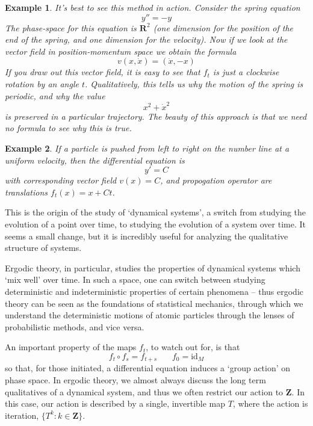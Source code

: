 \documentclass[12pt]{report}
\theoremstyle{plain}
\newtheorem*{example}{Example}
\theoremstyle{definition}
\begin{document}
\begin{example}
    It's best to see this method in action. Consider the spring equation
    \[ y'' = -y \]
    The phase-space for this equation is $\mathbf{R}^2$ (one dimension for the position of the end of the spring, and one dimension for the velocity). Now if we look at the vector field in position-momentum space we obtain the formula
    \[ v(x,\dot{x}) = (\dot{x}, -x) \]
    If you draw out this vector field, it is easy to see that $f_t$ is just a clockwise rotation by an angle $t$. Qualitatively, this tells us why the motion of the spring is periodic, and why the value
    \[ x^2 + \dot{x}^2 \]
    is preserved in a particular trajectory. The beauty of this approach is that we need no formula to see why this is true.
\end{example}

\begin{example}
    If a particle is pushed from left to right on the number line at a uniform velocity, then the differential equation is
    \[ y' = C \]
    with corresponding vector field $v(x) = C$, and propogation operator are translations $f_t(x) = x + Ct$.
\end{example}

This is the origin of the study of `dynamical systems', a switch from studying the evolution of a point over time, to studying the evolution of a system over time. It seems a small change, but it is incredibly useful for analyzing the qualitative structure of systems.

Ergodic theory, in particular, studies the properties of dynamical systems which `mix well' over time. In such a space, one can switch between studying deterministic and indeterministic properties of certain phenomena -- thus ergodic theory can be seen as the foundations of statistical mechanics, through which we understand the deterministic motions of atomic particles through the lenses of probabilistic methods, and vice versa.

An important property of the maps $f_t$, to watch out for, is that
%
\[ f_t \circ f_s = f_{t+s}\ \ \ \ \ \ \ \ f_0 = \text{id}_M \]
%
so that, for those initiated, a differential equation induces a `group action' on phase space. In ergodic theory, we almost always discuss the long term qualitatives of a dynamical system, and thus we often restrict our action to $\mathbf{Z}$. In this case, our action is described by a single, invertible map $T$, where the action is iteration, $\{ T^k : k \in \mathbf{Z} \}$.
\end{document}
